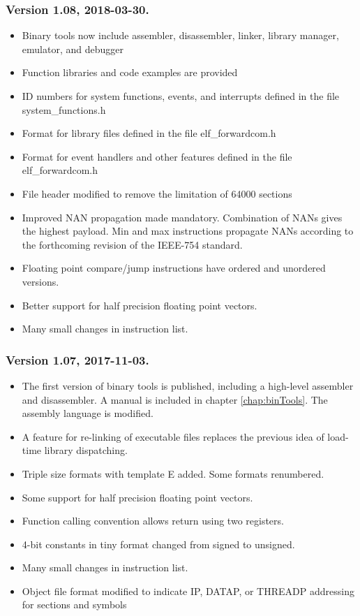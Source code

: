 \documentclass[forwardcom.tex]{subfiles}
\begin{document}
\subsubsection{Version 1.08, 2018-03-30.}
\begin{itemize}

\item Binary tools now include assembler, disassembler, linker, library manager, emulator, and debugger
\item Function libraries and code examples are provided
\item ID numbers for system functions, events, and interrupts defined in the file system\_functions.h
\item Format for library files defined in the file elf\_forwardcom.h
\item Format for event handlers and other features defined in the file elf\_forwardcom.h
\item File header modified to remove the limitation of 64000 sections
\item Improved NAN propagation made mandatory. Combination of NANs gives the highest payload. 
Min and max instructions propagate NANs according to the forthcoming revision of the IEEE-754 standard.
\item Floating point compare/jump instructions have ordered and unordered versions.
\item Better support for half precision floating point vectors.
\item Many small changes in instruction list. 
\end{itemize}


\subsubsection{Version 1.07, 2017-11-03.}
\begin{itemize}
\item The first version of binary tools is published, including a high-level assembler and disassembler. A manual is included in chapter \ref{chap:binTools}. The assembly language is modified.
\item A feature for re-linking of executable files replaces the previous idea of load-time library dispatching.
\item Triple size formats with template E added. Some formats renumbered.
\item Some support for half precision floating point vectors.
\item Function calling convention allows return using two registers.
\item 4-bit constants in tiny format changed from signed to unsigned.
\item Many small changes in instruction list.
\item Object file format modified to indicate IP, DATAP, or THREADP addressing for sections and symbols
\end{itemize}
\end{document}
